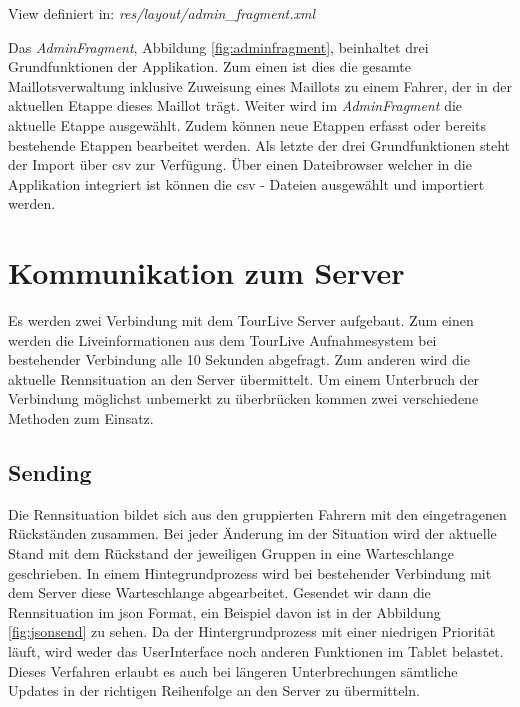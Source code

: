 View definiert in:
\textit{res/layout/admin\_fragment.xml} 

Das \textit{AdminFragment}, Abbildung \ref{fig:adminfragment}, beinhaltet drei Grundfunktionen der Applikation.
Zum einen ist dies die gesamte Maillotsverwaltung inklusive Zuweisung eines Maillots zu einem Fahrer, der in der aktuellen Etappe dieses Maillot trägt.
Weiter wird im \textit{AdminFragment} die aktuelle Etappe ausgewählt. Zudem können neue Etappen erfasst oder bereits bestehende Etappen bearbeitet werden. 
Als letzte der drei Grundfunktionen steht der Import über \gls{csv} zur Verfügung. Über einen Dateibrowser welcher in die Applikation integriert ist können die \gls{csv} - Dateien ausgewählt und importiert werden.  

\section{Kommunikation zum Server}
Es werden zwei Verbindung mit dem TourLive Server aufgebaut. Zum einen werden die Liveinformationen aus dem TourLive Aufnahmesystem bei bestehender Verbindung alle 10 Sekunden abgefragt. Zum anderen wird die aktuelle Rennsituation an den Server übermittelt. Um einem Unterbruch der Verbindung möglichst unbemerkt zu überbrücken kommen zwei verschiedene Methoden zum Einsatz.

\subsection{Sending}
Die Rennsituation bildet sich aus den gruppierten Fahrern mit den eingetragenen Rückständen zusammen. Bei jeder Änderung im der Situation wird der aktuelle Stand mit dem Rückstand der jeweiligen Gruppen in eine Warteschlange geschrieben. In einem Hintegrundprozess wird bei bestehender Verbindung mit dem Server diese Warteschlange abgearbeitet. Gesendet wir dann die Rennsituation im \gls{json} Format, ein Beispiel davon ist in der Abbildung \ref{fig:jsonsend} zu sehen. Da der Hintergrundprozess mit einer niedrigen Priorität läuft, wird weder das UserInterface noch anderen Funktionen im Tablet belastet. Dieses Verfahren erlaubt es auch bei längeren Unterbrechungen sämtliche Updates in der richtigen Reihenfolge an den Server zu übermitteln.
\newpage

